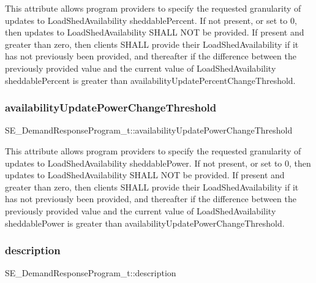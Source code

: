 This attribute allows program providers to specify the requested granularity of updates to Load\+Shed\+Availability sheddable\+Percent. If not present, or set to 0, then updates to Load\+Shed\+Availability S\+H\+A\+LL N\+OT be provided. If present and greater than zero, then clients S\+H\+A\+LL provide their Load\+Shed\+Availability if it has not previously been provided, and thereafter if the difference between the previously provided value and the current value of Load\+Shed\+Availability sheddable\+Percent is greater than availability\+Update\+Percent\+Change\+Threshold. \mbox{\label{group__DemandResponseProgram_gaa9a70f7f15f23119e07dc018038b5fd4}} 
\subsubsection{\texorpdfstring{availability\+Update\+Power\+Change\+Threshold}{availabilityUpdatePowerChangeThreshold}}
{\footnotesize\ttfamily S\+E\+\_\+\+Demand\+Response\+Program\+\_\+t\+::availability\+Update\+Power\+Change\+Threshold}

This attribute allows program providers to specify the requested granularity of updates to Load\+Shed\+Availability sheddable\+Power. If not present, or set to 0, then updates to Load\+Shed\+Availability S\+H\+A\+LL N\+OT be provided. If present and greater than zero, then clients S\+H\+A\+LL provide their Load\+Shed\+Availability if it has not previously been provided, and thereafter if the difference between the previously provided value and the current value of Load\+Shed\+Availability sheddable\+Power is greater than availability\+Update\+Power\+Change\+Threshold. \mbox{\label{group__DemandResponseProgram_ga5ba27e88d6bbc2941240c7ed18ab91c7}} 
\subsubsection{\texorpdfstring{description}{description}}
{\footnotesize\ttfamily S\+E\+\_\+\+Demand\+Response\+Program\+\_\+t\+::description}

